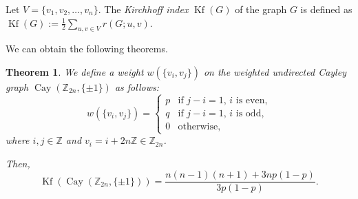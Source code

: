 \documentclass[12pt, leqno]{amsart}
\numberwithin{equation}{section}
\theoremstyle{plain}
\newtheorem{thm}{Theorem}[section]
\theoremstyle{definition}
\newcommand{\ZZ}{\mathbb{Z}}
\newcommand{\0}{\mathbf{0}}
\DeclareMathOperator{\Cay}{Cay}
\DeclareMathOperator{\Kf}{Kf}
\begin{document}
Let $V=\{v_1,v_2,\ldots,v_n\}$.
The {\it Kirchhoff index} $\Kf(G)$ of the %
graph $G$
 is defined as $\Kf(G):=\frac{1}{2}\sum_{u,v\in V}r(G;u,v)$.

We can obtain the following theorems.

\begin{thm}
We define a weight $w(\{v_i,v_j\})$ on the weighted undirected Cayley graph $\Cay(\ZZ_{2n},\{\pm1\})$ as follows:
\[
w(\{v_i,v_j\})=
\begin{cases}
p &\text{if $j-i=1$, $i$ is even,}\\
q &\text{if $j-i=1$, $i$ is odd,}\\
0 &\text{otherwise,}
\end{cases}
\]
where $i,j\in \ZZ$ and $v_i=i+2n\ZZ\in\ZZ_{2n}$.

Then, %
\[
\Kf(\Cay(\ZZ_{2n},\{\pm1\}))=\frac{n(n-1)(n+1)+3np(1-p)}{3p(1-p)}.
\]
\end{thm}
\end{document}
